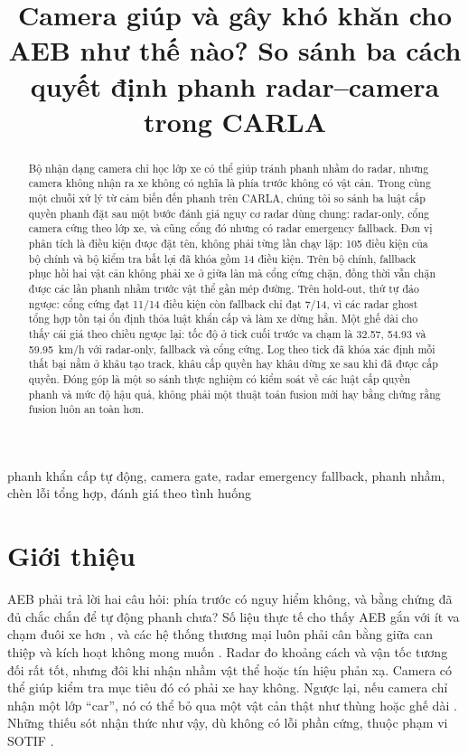 \documentclass[conference]{IEEEtran}
\title{Camera giúp và gây khó khăn cho AEB như thế nào? So sánh ba cách quyết định phanh radar--camera trong CARLA}
\author{
\IEEEauthorblockN{Mai Việt Hoàng và Phạm Đức An}
\IEEEauthorblockA{\textit{Đại học Bách khoa Hà Nội}\\
Hà Nội, Việt Nam\\hoangmai04222@gmail.com}
}
\begin{document}
\maketitle

\begin{abstract}
Bộ nhận dạng camera chỉ học lớp xe có thể giúp tránh phanh nhầm do radar, nhưng
camera không nhận ra xe không có nghĩa là phía trước không có vật cản. Trong
cùng một chuỗi xử lý từ cảm biến đến phanh trên CARLA, chúng tôi so sánh ba
luật cấp quyền phanh đặt sau một bước đánh giá nguy cơ radar dùng chung:
radar-only, cổng camera cứng theo lớp xe, và cũng cổng đó nhưng có radar
emergency fallback. Đơn vị phân tích là điều kiện được đặt tên, không phải
từng lần chạy lặp: 105 điều kiện của bộ chính và bộ kiểm tra bất lợi đã khóa
gồm 14 điều kiện. Trên bộ chính, fallback phục hồi hai vật cản không phải xe ở
giữa làn mà cổng cứng chặn, đồng thời vẫn chặn được các lần phanh nhầm trước
vật thể gần mép đường. Trên hold-out, thứ tự đảo ngược: cổng cứng đạt 11/14
điều kiện còn fallback chỉ đạt 7/14, vì các radar ghost tổng hợp tồn tại ổn
định thỏa luật khẩn cấp và làm xe dừng hẳn. Một ghế dài cho thấy cái giá theo
chiều ngược lại: tốc độ ở tick cuối trước va chạm là 32.57, 54.93 và
59.95~km/h với radar-only, fallback và cổng cứng. Log theo tick đã khóa xác
định mỗi thất bại nằm ở khâu tạo track, khâu cấp quyền hay khâu dừng xe sau
khi đã được cấp quyền. Đóng góp là một so sánh thực nghiệm có kiểm soát về
các luật cấp quyền phanh và mức độ hậu quả, không phải một thuật toán fusion
mới hay bằng chứng rằng fusion luôn an toàn hơn.
\end{abstract}
\begin{IEEEkeywords}
phanh khẩn cấp tự động, camera gate, radar emergency fallback,
phanh nhầm, chèn lỗi tổng hợp, đánh giá theo tình huống
\end{IEEEkeywords}

\section{Giới thiệu}
AEB phải trả lời hai câu hỏi: phía trước có nguy hiểm không, và bằng chứng đã
đủ chắc chắn để tự động phanh chưa? Số liệu thực tế cho thấy AEB gắn với ít va
chạm đuôi xe hơn \cite{cicchino2017effectiveness}, và các hệ thống thương mại
luôn phải cân bằng giữa can thiệp và kích hoạt không mong muốn
\cite{coelingh2010collision}. Radar đo khoảng cách và vận tốc tương đối
rất tốt, nhưng đôi khi nhận nhầm vật thể hoặc tín hiệu phản xạ. Camera có thể
giúp kiểm tra mục tiêu đó có phải xe hay không. Ngược lại, nếu camera chỉ nhận
một lớp ``car'', nó có thể bỏ qua một vật cản thật như thùng hoặc ghế dài
\cite{yang2022aebreview}. Những thiếu sót nhận thức như vậy, dù không có lỗi
phần cứng, thuộc phạm vi SOTIF \cite{iso21448}.
\end{document}
